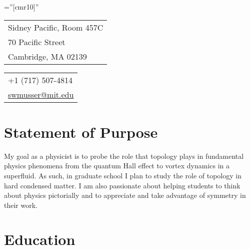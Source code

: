 \documentclass[10pt]{article} %
\begin{document}
\newcommand{\com}[1]{}

\pagestyle{empty} %

\font\fb=''[cmr10]'' %

\par{\bigskip\par} %



\begin{tabular}[t]{@{}l} 
  Sidney Pacific, Room 457C\\ 
  70 Pacific Street\\
  Cambridge, MA 02139
\end{tabular}
\hfill%
\begin{tabular}[t]{l@{}}
   +1 (717) 507-4814\\
	\href{mailto:swmusser@mit.edu}{swmusser@mit.edu}
\end{tabular}


\section{Statement of Purpose}

My goal as a physicist is to probe the role that topology plays in fundamental physics phenomena from the quantum Hall effect to vortex dynamics in a superfluid.  As such, in graduate school I plan to study the role of topology in hard condensed matter.  I am also passionate about helping students to think about physics pictorially and to appreciate and take advantage of symmetry in their work.



\section{Education}
\end{document}
